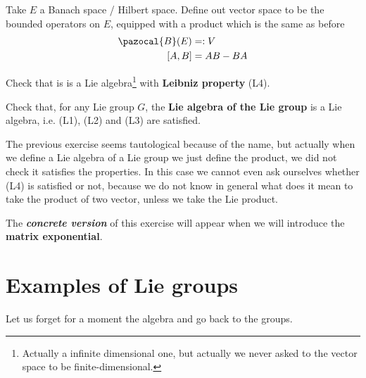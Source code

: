\documentclass[../main.tex]{subfiles}
\begin{document}
\begin{example}
Take $E$ a Banach space / Hilbert space. Define out vector space to be the bounded operators on $E$, equipped with a product which is the same as before
\[
\begin{split}
    \pazocal{B}(E)&=:V\\
    \comm{A}{B}&=AB-BA
\end{split}
\]
\end{example}
\begin{exercise}
Check that is is a Lie algebra\footnote{Actually a infinite dimensional one, but actually we never asked to the vector space to be finite-dimensional.} with \textbf{Leibniz property} (L4).
\end{exercise}
\begin{starredExercise}
Check that, for any Lie group $G$, the \textbf{Lie algebra of the Lie group} is a Lie algebra, i.e. (L1), (L2) and (L3) are satisfied.
\end{starredExercise}
The previous exercise seems tautological because of the name, but actually when we define a Lie algebra of a Lie group we just define the product, we did not check it satisfies the properties. In this case we cannot even ask ourselves whether (L4) is satisfied or not, because we do not know in general what does it mean to take the product of two vector, unless we take the Lie product.
\begin{kaobox}[frametitle=Note]
The \textbf{\textit{concrete version}} of this exercise will appear when we will introduce the \textbf{matrix exponential}.
\end{kaobox}
\section{Examples of Lie groups}
Let us forget for a moment the algebra and go back to the groups.
\end{document}
